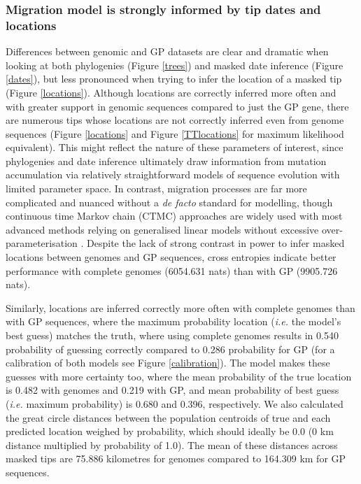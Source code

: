 \documentclass[11pt,oneside,letterpaper]{article}
\def\tbc#1{\textcolor{purple}{[#1]}}
\begin{document}
\subsubsection*{Migration model is strongly informed by tip dates and locations}

Differences between genomic and GP datasets are clear and dramatic when looking at both phylogenies (Figure \ref{trees}) and masked date inference (Figure \ref{dates}), but less pronounced when trying to infer the location of a masked tip (Figure \ref{locations}).
Although locations are correctly inferred more often and with greater support in genomic sequences compared to just the GP gene, there are numerous tips whose locations are not correctly inferred even from genome sequences (Figure \ref{locations} and Figure \ref{TTlocations} for maximum likelihood equivalent).
This might reflect the nature of these parameters of interest, since phylogenies and date inference ultimately draw information from mutation accumulation via relatively straightforward models of sequence evolution with limited parameter space.
In contrast, migration processes are far more complicated and nuanced without a \textit{de facto} standard for modelling, though continuous time Markov chain (CTMC) approaches are widely used \citep{lemey_bayesian_2009} with most advanced methods relying on generalised linear models without excessive over-parameterisation \citep{faria_simultaneously_2013,lemey_unifying_2014,dudas_virus_2017}.
Despite the lack of strong contrast in power to infer masked locations between genomes and GP sequences, cross entropies indicate better performance with complete genomes (6054.631 nats) than with GP (9905.726 nats).

Similarly, locations are inferred correctly more often with complete genomes than with GP sequences, where the maximum probability location (\textit{i.e.} the model's best guess) matches the truth, where using complete genomes results in 0.540 probability of guessing correctly compared to 0.286 probability for GP (for a calibration of both models see Figure \ref{calibration}).
The model makes these guesses with more certainty too, where the mean probability of the true location is 0.482 with genomes and 0.219 with GP, and mean probability of best guess (\textit{i.e.} maximum probability) is 0.680 and 0.396, respectively.
We also calculated the great circle distances between the population centroids of true and each predicted location weighed by probability, which should ideally be 0.0 (0 km distance multiplied by probability of 1.0).
The mean of these distances across masked tips are 75.886 kilometres for genomes compared to 164.309 km for GP sequences.
\end{document}
